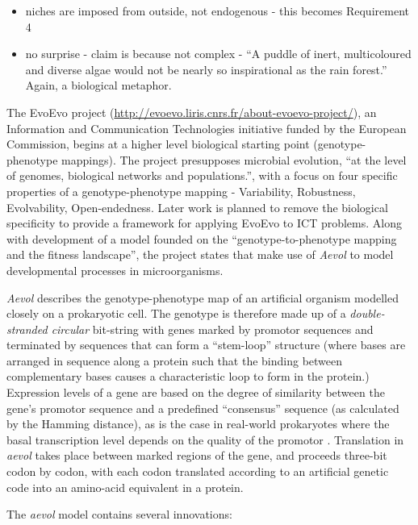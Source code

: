 \begin{itemize}
	\item niches are imposed from outside, not endogenous - this becomes Requirement 4
	\item no surprise - claim is because not complex - ``A puddle of inert,
	multicoloured and diverse algae would not be nearly so inspirational
	as the rain forest.'' Again, a biological metaphor.	
\end{itemize}

The EvoEvo project (\url{http://evoevo.liris.cnrs.fr/about-evoevo-project/}), an Information and Communication Technologies initiative funded by the European Commission, begins at a higher level biological starting point (genotype-phenotype mappings). The project presupposes microbial evolution, ``at the level of genomes, biological networks and populations.'', with a focus on four specific properties of a genotype-phenotype mapping - Variability, Robustness, Evolvability, Open-endedness. Later work is planned to remove the biological specificity to provide a framework for applying EvoEvo to ICT problems. Along with development of a model founded on the ``genotype-to-phenotype mapping and the fitness landscape'', the project states that make use of \emph{Aevol} \parencite{Knibbe:2006vn,Knibbe:2007kx} to model developmental processes in microorganisms.

\emph{Aevol} describes the genotype-phenotype map of an artificial organism modelled closely on a prokaryotic cell. The genotype is therefore made up of a \emph{double-stranded circular} bit-string with genes marked by promotor sequences and terminated by sequences that can form a ``stem-loop'' structure (where bases are arranged in sequence along a protein such that the binding between complementary bases causes a characteristic loop to form in the protein.) Expression levels of a gene are based on the degree of similarity between the gene's promotor sequence and a predefined ``consensus'' sequence (as calculated by the Hamming distance), as is the case in real-world prokaryotes where the basal transcription level depends on the quality of the promotor \parencite{Sanchez-Dehesa:2008uq}. Translation in \emph{aevol} takes place between marked regions of the gene, and proceeds three-bit codon by codon, with each codon translated according to an artificial genetic code into an amino-acid equivalent in a protein.

The \emph{aevol} model contains several innovations:

